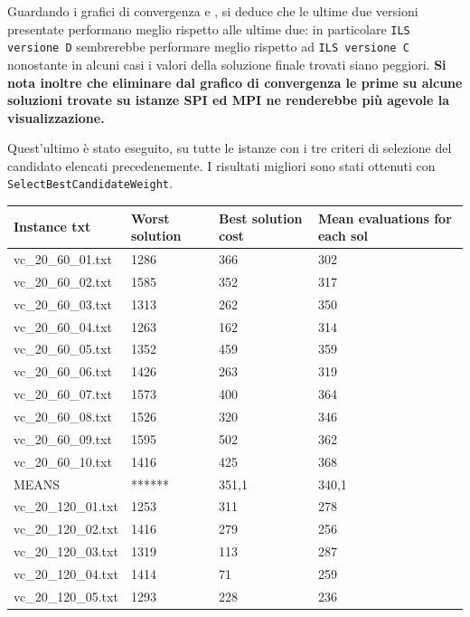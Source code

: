 \documentclass[11pt]{article}
\begin{document}
\pagebreak

Guardando i grafici di convergenza e , si deduce che le ultime due versioni presentate performano meglio rispetto alle ultime due: in particolare \verb|ILS versione D| sembrerebbe performare meglio rispetto ad \verb|ILS versione C| nonostante in alcuni casi i valori della soluzione finale trovati siano peggiori.
\textbf{Si nota inoltre che eliminare dal grafico di convergenza le prime su alcune soluzioni trovate su istanze SPI ed MPI ne renderebbe più agevole la visualizzazione.}

Quest'ultimo è stato eseguito, su tutte le istanze con i tre criteri di selezione del candidato elencati precedenemente. 
I risultati migliori sono stati ottenuti con \verb|SelectBestCandidateWeight|.

\begin{table}[!ht]
    \centering
    \begin{tabular}{|l|l|l|l|}
    \hline
        Instance txt & Worst solution & Best solution cost & Mean evaluations for each sol \\ \hline
        vc\_20\_60\_01.txt & 1286 & 366 & 302 \\ \hline
        vc\_20\_60\_02.txt & 1585 & 352 & 317 \\ \hline
        vc\_20\_60\_03.txt & 1313 & 262 & 350 \\ \hline
        vc\_20\_60\_04.txt & 1263 & 162 & 314 \\ \hline
        vc\_20\_60\_05.txt & 1352 & 459 & 359 \\ \hline
        vc\_20\_60\_06.txt & 1426 & 263 & 319 \\ \hline
        vc\_20\_60\_07.txt & 1573 & 400 & 364 \\ \hline
        vc\_20\_60\_08.txt & 1526 & 320 & 346 \\ \hline
        vc\_20\_60\_09.txt & 1595 & 502 & 362 \\ \hline
        vc\_20\_60\_10.txt & 1416 & 425 & 368 \\ \hline
        MEANS & ****** & 351,1 & 340,1 \\ \hline
        vc\_20\_120\_01.txt & 1253 & 311 & 278 \\ \hline
        vc\_20\_120\_02.txt & 1416 & 279 & 256 \\ \hline
        vc\_20\_120\_03.txt & 1319 & 113 & 287 \\ \hline
        vc\_20\_120\_04.txt & 1414 & 71 & 259 \\ \hline
        vc\_20\_120\_05.txt & 1293 & 228 & 236 \\ \hline

\end{tabular}
\end{table}
\end{document}
